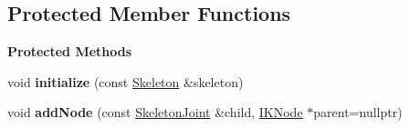 \subsection*{Protected Member Functions}
\begin{Indent}\textbf{ Protected Methods}\par
\begin{DoxyCompactItemize}
\item 
\mbox{\label{classrev_1_1_i_k_chain_af1e451156f52fdbe44fe67ecd7279f70}} 
void {\bfseries initialize} (const \mbox{\hyperlink{classrev_1_1_skeleton}{Skeleton}} \&skeleton)
\item 
\mbox{\label{classrev_1_1_i_k_chain_a8d8bac983e5c6d3f5b7c52a3953864f8}} 
void {\bfseries add\+Node} (const \mbox{\hyperlink{classrev_1_1_skeleton_joint}{Skeleton\+Joint}} \&child, \mbox{\hyperlink{classrev_1_1_i_k_node}{I\+K\+Node}} $\ast$parent=nullptr)
\end{DoxyCompactItemize}
\end{Indent}
